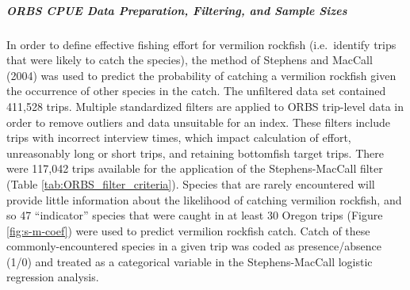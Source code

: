 \documentclass[11pt,
  english,
  a4paper,
]{article}
\begin{document}
\leavevmode\tagmcend\tagstructend\par


\hypertarget{orbs-cpue-data-preparation-filtering-and-sample-sizes}{%
\subparagraph{ORBS CPUE Data Preparation, Filtering, and Sample Sizes}\label{orbs-cpue-data-preparation-filtering-and-sample-sizes}}

\leavevmode\tagmcend\tagstructend


In order to define effective fishing effort for vermilion rockfish (i.e.~identify trips that were likely to catch the species), the method of Stephens and MacCall {(2004)\leavevmode\tagmcend\tagstructend} was used to predict the probability of catching a vermilion rockfish given the occurrence of other species in the catch. The unfiltered data set contained 411,528 trips. Multiple standardized filters are applied to ORBS trip-level data in order to remove outliers and data unsuitable for an index. These filters include trips with incorrect interview times, which impact calculation of effort, unreasonably long or short trips, and retaining bottomfish target trips. There were 117,042 trips available for the application of the Stephens-MacCall filter (Table \ref{tab:ORBS_filter_criteria}). Species that are rarely encountered will provide little information about the likelihood of catching vermilion rockfish, and so 47 ``indicator'' species that were caught in at least 30 Oregon trips (Figure \ref{fig:s-m-coef}) were used to predict vermilion rockfish catch. Catch of these commonly-encountered species in a given trip was coded as presence/absence (1/0) and treated as a categorical variable in the Stephens-MacCall logistic regression analysis.

\leavevmode\tagmcend\tagstructend\par

\end{document}
